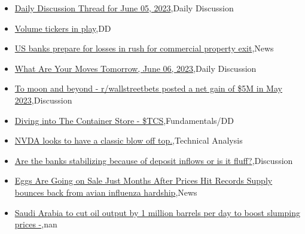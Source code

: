 \documentclass{article}%
\begin{document}
%
\begin{itemize}%
\item%
\href{https://reddit.com/r/wallstreetbets/comments/141co1h/daily\_discussion\_thread\_for\_june\_05\_2023/}{Daily Discussion Thread for June 05, 2023},Daily Discussion%
\item%
\href{https://reddit.com/r/wallstreetbets/comments/141ca8b/volume\_tickers\_in\_play/}{Volume tickers in play},DD%
\item%
\href{https://reddit.com/r/wallstreetbets/comments/1419ant/us\_banks\_prepare\_for\_losses\_in\_rush\_for/}{US banks prepare for losses in rush for commercial property exit},News%
\item%
\href{https://reddit.com/r/wallstreetbets/comments/1416t5j/what\_are\_your\_moves\_tomorrow\_june\_06\_2023/}{What Are Your Moves Tomorrow, June 06, 2023},Daily Discussion%
\item%
\href{https://reddit.com/r/wallstreetbets/comments/1416goo/to\_moon\_and\_beyond\_rwallstreetbets\_posted\_a\_net/}{To moon and beyond  - r/wallstreetbets posted a net gain of \$5M in May 2023},Discussion%
\item%
\href{https://reddit.com/r/StockMarket/comments/140wudk/diving\_into\_the\_container\_store\_tcs/}{Diving into The Container Store - \$TCS},Fundamentals/DD%
\item%
\href{https://reddit.com/r/StockMarket/comments/140spp1/nvda\_looks\_to\_have\_a\_classic\_blow\_off\_top/}{NVDA looks to have a classic blow off top.},Technical Analysis%
\item%
\href{https://reddit.com/r/StockMarket/comments/140pizo/are\_the\_banks\_stabilizing\_because\_of\_deposit/}{Are the banks stabilizing because of deposit inflows or is it fluff?},Discussion%
\item%
\href{https://reddit.com/r/Economics/comments/141bp3w/eggs\_are\_going\_on\_sale\_just\_months\_after\_prices/}{Eggs Are Going on Sale Just Months After Prices Hit Records  Supply bounces back from avian influenza hardship},News%
\item%
\href{https://reddit.com/r/Economics/comments/1412gsq/saudi\_arabia\_to\_cut\_oil\_output\_by\_1\_million/}{Saudi Arabia to cut oil output by 1 million barrels per day to boost slumping prices -},nan%
\end{itemize}%
\end{document}
